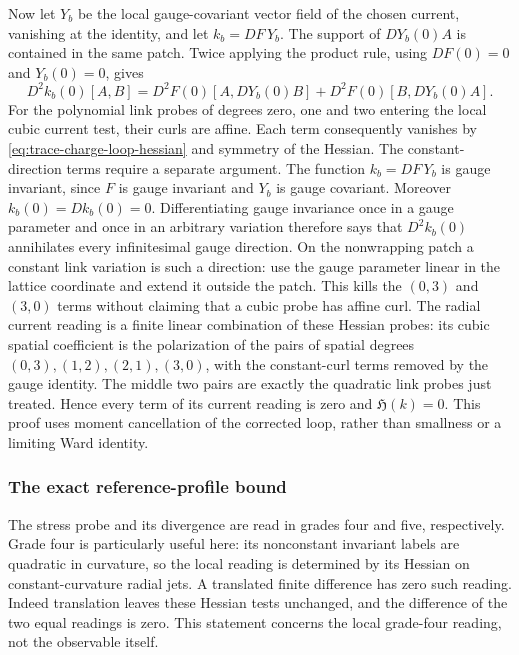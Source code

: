 Now let $Y_b$ be the local gauge-covariant vector field of the chosen
current, vanishing at the identity, and let $k_b=DF\,Y_b$. The support
of $DY_b(0)A$ is contained in the same patch. Twice applying the product
rule, using $DF(0)=0$ and $Y_b(0)=0$, gives
\[
 D^2k_b(0)[A,B]
 =D^2F(0)[A,DY_b(0)B]+D^2F(0)[B,DY_b(0)A].
\]
For the polynomial link probes of degrees zero, one and two entering the
local cubic current test, their curls are affine. Each term consequently
vanishes by \eqref{eq:trace-charge-loop-hessian} and symmetry of the
Hessian. The constant-direction terms require a separate argument. The function
$k_b=DF\,Y_b$ is gauge invariant, since $F$ is gauge invariant and $Y_b$
is gauge covariant. Moreover $k_b(0)=Dk_b(0)=0$. Differentiating gauge
invariance once in a gauge parameter and once in an arbitrary variation
therefore says that $D^2k_b(0)$ annihilates every infinitesimal gauge
direction. On the nonwrapping patch a constant link variation is such a
direction: use the gauge parameter linear in the lattice coordinate and
extend it outside the patch. This kills the $(0,3)$ and $(3,0)$ terms
without claiming that a cubic probe has affine curl.
The radial current reading is a finite linear combination of these
Hessian probes: its cubic spatial coefficient is the polarization of the
pairs of spatial degrees $(0,3),(1,2),(2,1),(3,0)$, with the constant-curl
terms removed by the gauge identity. The middle two pairs are exactly the
quadratic link probes just treated. Hence every term of its current
reading is zero and $\mathfrak H(k)=0$.
This proof uses moment cancellation of the corrected loop, rather than
smallness or a limiting Ward identity.

\subsubsection{The exact reference-profile bound}
\label{subsec:trace-reference-local-calibration}

The stress probe and its divergence are read in grades four and five,
respectively. Grade four is particularly useful here: its nonconstant
invariant labels are quadratic in curvature, so the local reading is
determined by its Hessian on constant-curvature radial jets. A translated
finite difference has zero such reading. Indeed translation leaves these
Hessian tests unchanged, and the difference of the two equal readings is
zero. This statement concerns the local grade-four reading, not the
observable itself.

